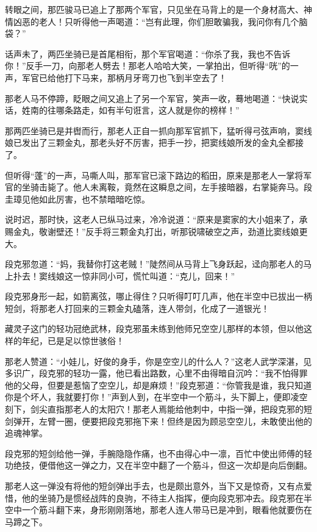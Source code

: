 \documentclass[12pt,oneside]{book}
\begin{document}
转眼之间，那匹骏马已追上了那两个军官，只见坐在马背上的是一个身材高大、神情凶恶的老人！只听得他一声喝道：``岂有此理，你们胆敢骗我，我问你有几个脑袋？''

话声未了，两匹坐骑已是首尾相衔，那个军官喝道：``你杀了我，我也不告诉你！''反手一刀，向那老人劈去！那老人哈哈大笑，一掌拍出，但听得``咣''的一声，军官已给他打下马来，那柄月牙弯刀也飞到半空去了！

那老人马不停蹄，眨眼之间又追上了另一个军官，笑声一收，蓦地喝道：``快说实话，姓南的往哪条路走，如有半句诳言，这人就是你的榜样！''

那两匹坐骑已是并辔而行，那老人正自一抓向那军官抓下，猛听得弓弦声响，窦线娘已发出了三颗金丸，那老头好不厉害，把手一抄，把窦线娘所发的金丸全都接了。

但听得``蓬''的一声，马嘶人叫，那军官已滚下路边的稻田，原来是那老人一掌将军官的坐骑击毙了。他人未离鞍，竟然在这瞬息之间，左手接暗器，右掌毙奔马。段圭璋见他如此厉害，也不禁暗暗吃惊。

说时迟，那时快，这老人已纵马过来，冷冷说道：``原来是窦家的大小姐来了，承赐金丸，敬谢壁还！''反手将三颗金丸打出，听那锐啸破空之声，劲道比窦线娘更大。

段克邪忽道：``妈，我替你打这老贼！''陡然间从马背上飞身跃起，迳向那老人的马上扑去！窦线娘这一惊非同小可，慌忙叫道：``克儿，回来！''

段克邪身形一起，如箭离弦，哪止得住？只听得叮叮几声，他在半空中已拔出一柄短剑，将那老人打回来的三颗金丸磕落，连人带剑，化成了一道银光！

藏灵子这门的轻功冠绝武林，段克邪虽未练到他师兄空空儿那样的本领，但以他这样的年纪，已是足以惊世骇俗！

那老人赞道：``小娃儿，好俊的身手，你是空空儿的什么人？''这老人武学深湛，见多识广，段克邪的轻功一露，他已看出路数，心里不由得暗自沉吟：``我不怕得罪他的父母，但要是惹恼了空空儿，却是麻烦！''段克邪道：``你管我是谁，我只知道你是个坏人，我就要打你！''声到人到，在半空中一个筋斗，头下脚上，便即凌空刻下，剑尖直指那老人的太阳穴！那老人焉能给他刺中，中指一弹，把段克邪的短剑弹开，左臂一圈，便要把段克邪拖下来！但终是因为顾忌空空儿，未敢使出他的追魂神掌。

段克邪的短剑给他一弹，手腕隐隐作痛，也不由得心中一凛，百忙中使出师傅的轻功绝技，便借他这一弹之力，又在半空中翻了一个筋斗，但这一次却是向后倒翻。

那老人这一弹没有将他的短剑弹出手去，也是颇出意外，当下又是惊奇，又有点爱惜，他的坐骑乃是惯经战阵的良驹，不待主人指挥，便向段克邪冲去。段克邪在半空中一个筋斗翻下来，身形刚刚落地，那老人连人带马已是冲到，眼看他就要伤在马蹄之下。
\end{document}
